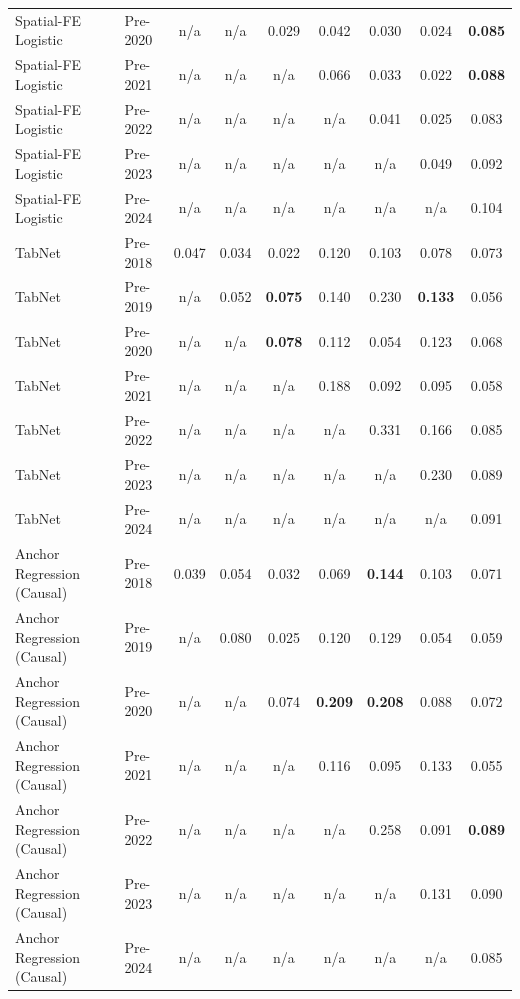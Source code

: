 \begin{table}[htbp]
{\begin{tabular}{l lccccccc}
Spatial-FE Logistic & Pre-2020 & n/a & n/a & 0.029 & 0.042 & 0.030 & 0.024 & \textbf{0.085} \\
Spatial-FE Logistic & Pre-2021 & n/a & n/a & n/a & 0.066 & 0.033 & 0.022 & \textbf{0.088} \\
Spatial-FE Logistic & Pre-2022 & n/a & n/a & n/a & n/a & 0.041 & 0.025 & 0.083 \\
Spatial-FE Logistic & Pre-2023 & n/a & n/a & n/a & n/a & n/a & 0.049 & 0.092 \\
Spatial-FE Logistic & Pre-2024 & n/a & n/a & n/a & n/a & n/a & n/a & 0.104 \\
TabNet & Pre-2018 & 0.047 & 0.034 & 0.022 & 0.120 & 0.103 & 0.078 & 0.073 \\
TabNet & Pre-2019 & n/a & 0.052 & \textbf{0.075} & 0.140 & 0.230 & \textbf{0.133} & 0.056 \\
TabNet & Pre-2020 & n/a & n/a & \textbf{0.078} & 0.112 & 0.054 & 0.123 & 0.068 \\
TabNet & Pre-2021 & n/a & n/a & n/a & 0.188 & 0.092 & 0.095 & 0.058 \\
TabNet & Pre-2022 & n/a & n/a & n/a & n/a & 0.331 & 0.166 & 0.085 \\
TabNet & Pre-2023 & n/a & n/a & n/a & n/a & n/a & 0.230 & 0.089 \\
TabNet & Pre-2024 & n/a & n/a & n/a & n/a & n/a & n/a & 0.091 \\
Anchor Regression (Causal) & Pre-2018 & 0.039 & 0.054 & 0.032 & 0.069 & \textbf{0.144} & 0.103 & 0.071 \\
Anchor Regression (Causal) & Pre-2019 & n/a & 0.080 & 0.025 & 0.120 & 0.129 & 0.054 & 0.059 \\
Anchor Regression (Causal) & Pre-2020 & n/a & n/a & 0.074 & \textbf{0.209} & \textbf{0.208} & 0.088 & 0.072 \\
Anchor Regression (Causal) & Pre-2021 & n/a & n/a & n/a & 0.116 & 0.095 & 0.133 & 0.055 \\
Anchor Regression (Causal) & Pre-2022 & n/a & n/a & n/a & n/a & 0.258 & 0.091 & \textbf{0.089} \\
Anchor Regression (Causal) & Pre-2023 & n/a & n/a & n/a & n/a & n/a & 0.131 & 0.090 \\
Anchor Regression (Causal) & Pre-2024 & n/a & n/a & n/a & n/a & n/a & n/a & 0.085 \\
\bottomrule
\end{tabular}%
}
\end{table}